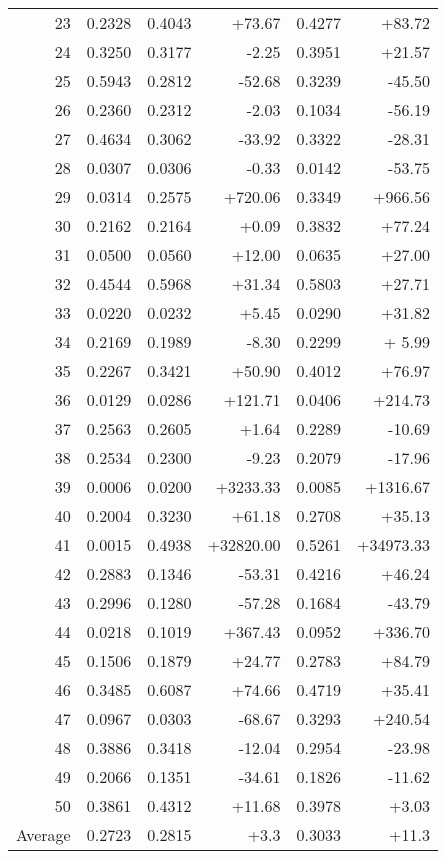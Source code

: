 \begin{table}[hbpt]
\begin{center}
\begin{tabular}{|r|r|r|r|r|r|}
23 & 0.2328 & 0.4043  & +73.67 & 0.4277 & +83.72 \\ 
24 & 0.3250 & 0.3177  & -2.25 & 0.3951 & +21.57 \\ 
25 & 0.5943 & 0.2812  & -52.68 & 0.3239 & -45.50 \\ 
26 & 0.2360 & 0.2312  & -2.03 & 0.1034 & -56.19 \\ 
27 & 0.4634 & 0.3062  & -33.92 & 0.3322 & -28.31 \\ 
28 & 0.0307 & 0.0306  & -0.33 & 0.0142 & -53.75 \\ 
29 & 0.0314 & 0.2575  & +720.06 & 0.3349 & +966.56 \\ 
30 & 0.2162 & 0.2164  & +0.09 & 0.3832 & +77.24 \\ 
31 & 0.0500 & 0.0560  & +12.00 & 0.0635 & +27.00 \\ 
32 & 0.4544 & 0.5968  & +31.34 & 0.5803 & +27.71 \\ 
33 & 0.0220 & 0.0232  & +5.45 & 0.0290 & +31.82 \\ 
34 & 0.2169 & 0.1989  & -8.30 & 0.2299 & + 5.99 \\ 
35 & 0.2267 & 0.3421  & +50.90 & 0.4012 & +76.97 \\ 
36 & 0.0129 & 0.0286  & +121.71 & 0.0406 & +214.73 \\ 
37 & 0.2563 & 0.2605  & +1.64 & 0.2289 & -10.69 \\ 
38 & 0.2534 & 0.2300  & -9.23 & 0.2079 & -17.96 \\ 
39 & 0.0006 & 0.0200  & +3233.33 & 0.0085 & +1316.67 \\ 
40 & 0.2004 & 0.3230  & +61.18 & 0.2708 & +35.13 \\ 
41 & 0.0015 & 0.4938  & +32820.00 & 0.5261 & +34973.33 \\ 
42 & 0.2883 & 0.1346  & -53.31 & 0.4216 & +46.24 \\ 
43 & 0.2996 & 0.1280  & -57.28 & 0.1684 & -43.79 \\ 
44 & 0.0218 & 0.1019  & +367.43 & 0.0952 & +336.70 \\ 
45 & 0.1506 & 0.1879  & +24.77 & 0.2783 & +84.79 \\ 
46 & 0.3485 & 0.6087  & +74.66 & 0.4719 & +35.41 \\ 
47 & 0.0967 & 0.0303  & -68.67 & 0.3293 & +240.54 \\ 
48 & 0.3886 & 0.3418  & -12.04 & 0.2954 & -23.98 \\ 
49 & 0.2066 & 0.1351  & -34.61 & 0.1826 & -11.62 \\ 
50 & 0.3861 & 0.4312  & +11.68 & 0.3978 & +3.03 \\ \hline
Average & 0.2723 & 0.2815 & +3.3 & 0.3033 & +11.3 \\ \hline  
    \end{tabular}
   \label{tab:reranking}
  \end{center}
\end{table}
\normalsize



